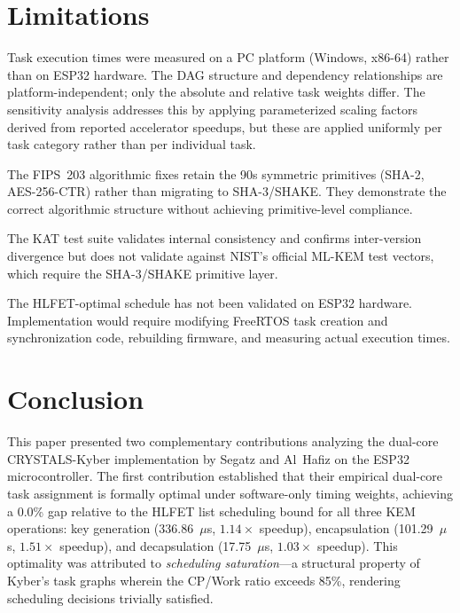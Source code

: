 \documentclass[journal]{IEEEtran}
\begin{document}
\section{Limitations}

Task execution times were measured on a PC platform (Windows, x86-64) rather than on ESP32 hardware. The DAG structure and dependency relationships are platform-independent; only the absolute and relative task weights differ. The sensitivity analysis addresses this by applying parameterized scaling factors derived from reported accelerator speedups, but these are applied uniformly per task category rather than per individual task.

The FIPS~203 algorithmic fixes retain the 90s symmetric primitives (SHA-2, AES-256-CTR) rather than migrating to SHA-3/SHAKE. They demonstrate the correct algorithmic structure without achieving primitive-level compliance.

The KAT test suite validates internal consistency and confirms inter-version divergence but does not validate against NIST's official ML-KEM test vectors, which require the SHA-3/SHAKE primitive layer.

The HLFET-optimal schedule has not been validated on ESP32 hardware. Implementation would require modifying FreeRTOS task creation and synchronization code, rebuilding firmware, and measuring actual execution times.


\section{Conclusion}

This paper presented two complementary contributions analyzing the dual-core CRYSTALS-Kyber implementation by Segatz and Al~Hafiz on the ESP32 microcontroller. The first contribution established that their empirical dual-core task assignment is formally optimal under software-only timing weights, achieving a 0.0\% gap relative to the HLFET list scheduling bound for all three KEM operations: key generation (336.86~$\mu$s, $1.14\times$ speedup), encapsulation (101.29~$\mu$s, $1.51\times$ speedup), and decapsulation (17.75~$\mu$s, $1.03\times$ speedup). This optimality was attributed to \emph{scheduling saturation}---a structural property of Kyber's task graphs wherein the CP/Work ratio exceeds 85\%, rendering scheduling decisions trivially satisfied.
\end{document}
